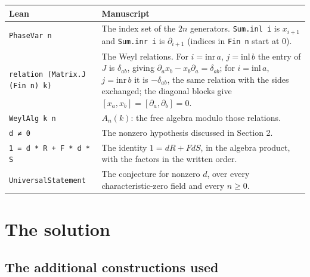 \documentclass[11pt,a4paper]{article}
\theoremstyle{definition}
\theoremstyle{plain}
\newcommand{\lean}[1]{\texttt{#1}}
\begin{document}
\begin{center}
\begin{tabular}{@{}lp{9.2cm}@{}}
\toprule
Lean & Manuscript \\
\midrule
\lean{PhaseVar n} & The index set of the $2n$ generators. \lean{Sum.inl i} is
  $x_{i+1}$ and \lean{Sum.inr i} is $\partial_{i+1}$ (indices in \lean{Fin n}
  start at $0$). \\
\lean{relation (Matrix.J (Fin n) k)} & The Weyl relations. For
  $i=\mathrm{inr}\,a$, $j=\mathrm{inl}\,b$ the entry of $J$ is $\delta_{ab}$,
  giving $\partial_a x_b-x_b\partial_a=\delta_{ab}$; for $i=\mathrm{inl}\,a$,
  $j=\mathrm{inr}\,b$ it is $-\delta_{ab}$, the same relation with the sides
  exchanged; the diagonal blocks give $[x_a,x_b]=[\partial_a,\partial_b]=0$. \\
\lean{WeylAlg k n} & $A_n(k)$: the free algebra modulo those relations. \\
\lean{d ≠ 0} & The nonzero hypothesis discussed in Section 2. \\
\lean{1 = d * R + F * d * S} & The identity $1=dR+FdS$, in the algebra
  product, with the factors in the written order. \\
\lean{UniversalStatement} & The conjecture for nonzero $d$, over every
  characteristic-zero field and every $n\ge 0$. \\
\bottomrule
\end{tabular}
\end{center}

\section{The solution}

\subsection{The additional constructions used}
\end{document}
